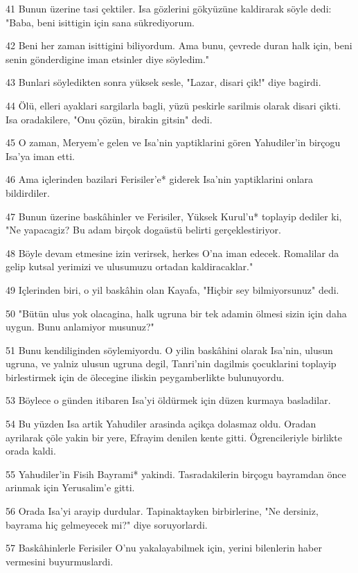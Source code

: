 \par 41 Bunun üzerine tasi çektiler. Isa gözlerini gökyüzüne kaldirarak söyle dedi: "Baba, beni isittigin için sana sükrediyorum.
\par 42 Beni her zaman isittigini biliyordum. Ama bunu, çevrede duran halk için, beni senin gönderdigine iman etsinler diye söyledim."
\par 43 Bunlari söyledikten sonra yüksek sesle, "Lazar, disari çik!" diye bagirdi.
\par 44 Ölü, elleri ayaklari sargilarla bagli, yüzü peskirle sarilmis olarak disari çikti. Isa oradakilere, "Onu çözün, birakin gitsin" dedi.
\par 45 O zaman, Meryem'e gelen ve Isa'nin yaptiklarini gören Yahudiler'in birçogu Isa'ya iman etti.
\par 46 Ama içlerinden bazilari Ferisiler'e* giderek Isa'nin yaptiklarini onlara bildirdiler.
\par 47 Bunun üzerine baskâhinler ve Ferisiler, Yüksek Kurul'u* toplayip dediler ki, "Ne yapacagiz? Bu adam birçok dogaüstü belirti gerçeklestiriyor.
\par 48 Böyle devam etmesine izin verirsek, herkes O'na iman edecek. Romalilar da gelip kutsal yerimizi ve ulusumuzu ortadan kaldiracaklar."
\par 49 Içlerinden biri, o yil baskâhin olan Kayafa, "Hiçbir sey bilmiyorsunuz" dedi.
\par 50 "Bütün ulus yok olacagina, halk ugruna bir tek adamin ölmesi sizin için daha uygun. Bunu anlamiyor musunuz?"
\par 51 Bunu kendiliginden söylemiyordu. O yilin baskâhini olarak Isa'nin, ulusun ugruna, ve yalniz ulusun ugruna degil, Tanri'nin dagilmis çocuklarini toplayip birlestirmek için de ölecegine iliskin peygamberlikte bulunuyordu.
\par 53 Böylece o günden itibaren Isa'yi öldürmek için düzen kurmaya basladilar.
\par 54 Bu yüzden Isa artik Yahudiler arasinda açikça dolasmaz oldu. Oradan ayrilarak çöle yakin bir yere, Efrayim denilen kente gitti. Ögrencileriyle birlikte orada kaldi.
\par 55 Yahudiler'in Fisih Bayrami* yakindi. Tasradakilerin birçogu bayramdan önce arinmak için Yerusalim'e gitti.
\par 56 Orada Isa'yi arayip durdular. Tapinaktayken birbirlerine, "Ne dersiniz, bayrama hiç gelmeyecek mi?" diye soruyorlardi.
\par 57 Baskâhinlerle Ferisiler O'nu yakalayabilmek için, yerini bilenlerin haber vermesini buyurmuslardi.


